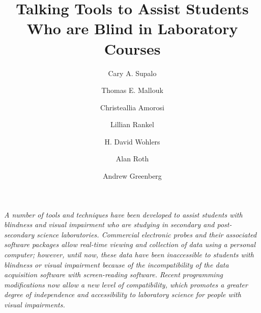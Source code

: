 \documentclass[11.5pt]{sig-alternate} %
\makeatletter
\let\oldabstract\abstract
\let\oldendabstract\endabstract
\renewenvironment{abstract} %
{\renewenvironment{quotation}%
               {\list{}{\addtolength{\leftmargin}{1em} %
                        \listparindent 1.5em%
                        \itemindent    \listparindent%
                        \rightmargin   \leftmargin%
                        \parsep        \z@ \@plus\p@}%
                \item\relax}%
               {\endlist}%
\oldabstract}
{\oldendabstract}
\makeatother
\begin{document}
\title{Talking Tools to Assist Students Who are Blind in Laboratory Courses}

\author[1]{\large \color{blue}Cary A. Supalo}
\author[2]{\large \color{blue}Thomas E. Mallouk}
\author[2]{\large \color{blue}Christeallia Amorosi}
\author[3]{\large \color{blue}Lillian Rankel}
\author[4]{\large \color{blue}H. David Wohlers}
\author[5]{\large \color{blue}Alan Roth}
\author[6]{\large \color{blue}Andrew Greenberg}


\toappear{}
\maketitle
\begin{@twocolumnfalse} 
\begin{abstract}
\item 
\textit{A number of tools and techniques have been developed to assist students with blindness and visual impairment who are studying in secondary and post-secondary science laboratories. Commercial electronic probes and their associated software packages allow real-time viewing and collection of data using a personal computer; however, until now, these data have been inaccessible to students with blindness or visual impairment because of the incompatibility of the data acquisition software with screen-reading software. Recent programming modifications now allow a new level of compatibility, which promotes a greater degree of independence and accessibility to laboratory science for people with visual impairments.}
\\ \\
\end{abstract}
\end{@twocolumnfalse}

\end{document}
